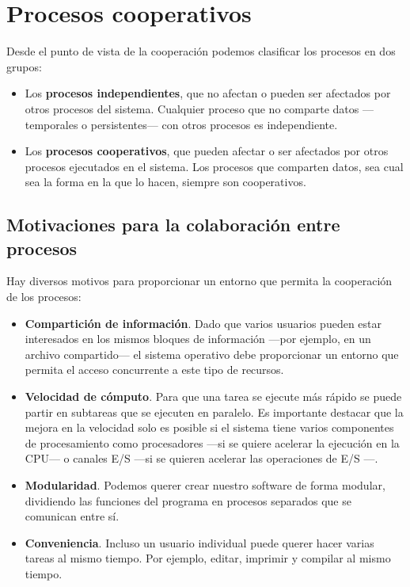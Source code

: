 \section{Procesos cooperativos}\label{_procesos_cooperativos}

Desde el punto de vista de la cooperación podemos clasificar los
procesos en dos grupos:

\begin{itemize}
\item
  Los \textbf{procesos independientes}{}, que no afectan o pueden ser
  afectados por otros procesos del sistema. Cualquier proceso que no
  comparte datos ---temporales o persistentes--- con otros procesos es
  independiente.
\item
  Los \textbf{procesos cooperativos}{}, que pueden afectar o ser
  afectados por otros procesos ejecutados en el sistema. Los procesos
  que comparten datos, sea cual sea la forma en la que lo hacen, siempre
  son cooperativos.
\end{itemize}

\subsection{Motivaciones para la colaboración entre
procesos}\label{_motivaciones_para_la_colaboracion_entre_procesos}

Hay diversos motivos para proporcionar un entorno que permita la
cooperación de los procesos:

\begin{itemize}
\item
  \textbf{Compartición de información}. Dado que varios usuarios pueden
  estar interesados en los mismos bloques de información ---por ejemplo,
  en un archivo compartido--- el sistema operativo debe proporcionar un
  entorno que permita el acceso concurrente a este tipo de recursos.
\item
  \textbf{Velocidad de cómputo}. Para que una tarea se ejecute más
  rápido se puede partir en subtareas que se ejecuten en paralelo. Es
  importante destacar que la mejora en la velocidad solo es posible si
  el sistema tiene varios componentes de procesamiento como procesadores
  ---si se quiere acelerar la ejecución en la CPU--- o canales E/S ---si
  se quieren acelerar las operaciones de E/S ---.
\item
  \textbf{Modularidad}. Podemos querer crear nuestro software de forma
  modular, dividiendo las funciones del programa en procesos separados
  que se comunican entre sí.
\item
  \textbf{Conveniencia}. Incluso un usuario individual puede querer
  hacer varias tareas al mismo tiempo. Por ejemplo, editar, imprimir y
  compilar al mismo tiempo.
\end{itemize}

